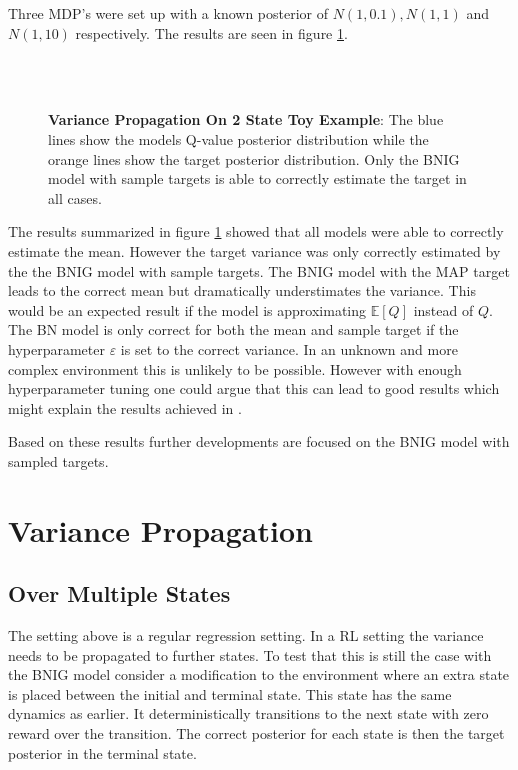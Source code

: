 Three MDP's were set up with a known posterior of $N(1, 0.1), N(1, 1)$ and $N(1, 10)$ respectively. The results are seen in figure \ref{fig:proptest}.

\begin{figure}[H]
    \centering
    \\
    \\
    \caption{\textbf{Variance Propagation On 2 State Toy Example}: The blue lines show the models Q-value posterior distribution while the orange lines show the target posterior distribution. Only the BNIG model with sample targets is able to correctly estimate the target in all cases.}
    \label{fig:proptest}
\end{figure}

The results summarized in figure \ref{fig:proptest} showed that all models were able to correctly estimate the mean. However the target variance was only correctly estimated by the the BNIG model with sample targets. The BNIG model with the MAP target leads to the correct mean but dramatically understimates the variance. This would be an expected result if the model is approximating $\mathbb{E}[Q]$ instead of $Q$. The BN model is only correct for both the mean and sample target if the hyperparameter $\varepsilon$ is set to the correct variance. In an unknown and more complex environment this is unlikely to be possible. However with enough hyperparameter tuning one could argue that this can lead to good results which might explain the results achieved in \cite{azziz_2018}.

Based on these results further developments are focused on the BNIG model with sampled targets.

\section{Variance Propagation}

\subsection{Over Multiple States}

The setting above is a regular regression setting. In a RL setting the variance needs to be propagated to further states. To test that this is still the case with the BNIG model consider a modification to the environment where an extra state is placed between the initial and terminal state. This state has the same dynamics as earlier. It deterministically transitions to the next state with zero reward over the transition. The correct posterior for each state is then the target posterior in the terminal state. 

